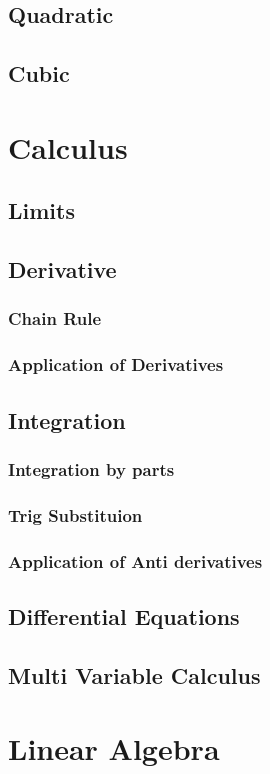 \documentclass[]{article}
\begin{document}
\subsection{Quadratic}
\subsection{Cubic}
\section{Calculus}
    \subsection{Limits}
    \subsection{Derivative}
    \subsubsection{Chain Rule}
    \subsubsection{Application of Derivatives}
    \subsection{Integration}
    \subsubsection{Integration by parts}
    \subsubsection{Trig Substituion}
    \subsubsection{Application of Anti derivatives}
    \subsection{Differential Equations}
    \subsection{Multi Variable Calculus}
    
    

\section{Linear Algebra}
\end{document}
